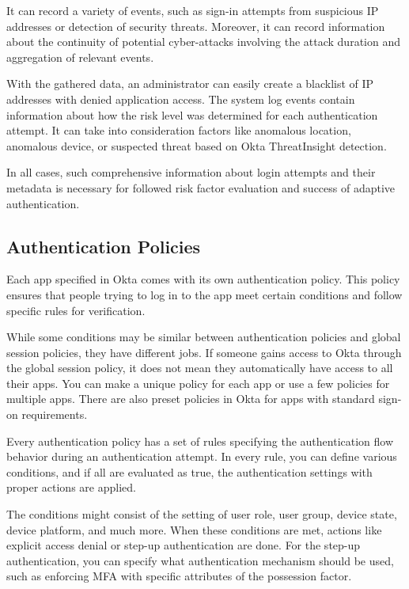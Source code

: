 It can record a variety of events, such as sign-in attempts from suspicious IP addresses or detection of security threats.
Moreover, it can record information about the continuity of potential cyber-attacks involving the attack duration and aggregation of relevant events.

With the gathered data, an administrator can easily create a blacklist of IP addresses with denied application access.
The system log events contain information about how the risk level was determined for each authentication attempt.
It can take into consideration factors like anomalous location, anomalous device, or suspected threat based on Okta ThreatInsight detection.\cite{existing-okta-risk-scoring}\cite{existing-okta-syslog}

In all cases, such comprehensive information about login attempts and their metadata is necessary for followed risk factor evaluation and success of adaptive authentication. 

\subsection*{Authentication Policies}
Each app specified in Okta comes with its own authentication policy.
This policy ensures that people trying to log in to the app meet certain conditions and follow specific rules for verification.

While some conditions may be similar between authentication policies and global session policies, they have different jobs. 
If someone gains access to Okta through the global session policy, it does not mean they automatically have access to all their apps.
You can make a unique policy for each app or use a few policies for multiple apps.
There are also preset policies in Okta for apps with standard sign-on requirements.

Every authentication policy has a set of rules specifying the authentication flow behavior during an authentication attempt.
In every rule, you can define various conditions, and if all are evaluated as true, the authentication settings with proper actions are applied.

The conditions might consist of the setting of user role, user group, device state, device platform, and much more.
When these conditions are met, actions like explicit access denial or step-up authentication are done.
For the step-up authentication, you can specify what authentication mechanism should be used, such as enforcing MFA with specific attributes of the possession factor.


